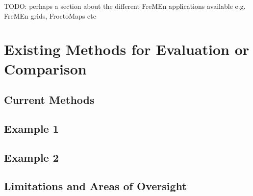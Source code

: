  TODO: perhaps a section about the different FreMEn applications available e.g.
  FreMEn grids, FroctoMaps etc

  \section{ Existing Methods for Evaluation or Comparison }

  \subsection{ Current Methods }
  \subsection { Example 1 }
  \subsection { Example 2 }

  \subsection{ Limitations and Areas of Oversight }

